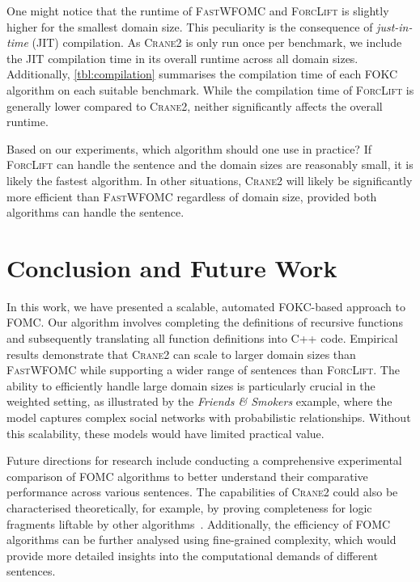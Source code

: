 \documentclass[a4paper,UKenglish,cleveref,autoref]{lipics-v2021}
\newcommand{\Cranetwo}{\textsc{Crane2}}
\newcommand{\friends}{\emph{Friends \& Smokers}}
\begin{document}
One might notice that the runtime of \textsc{FastWFOMC} and \textsc{ForcLift} is
slightly higher for the smallest domain size. This peculiarity is the
consequence of \emph{just-in-time} (JIT) compilation. As \Cranetwo{} is only run
once per benchmark, we include the JIT compilation time in its overall runtime
across all domain sizes. Additionally, \cref{tbl:compilation} summarises the
compilation time of each FOKC algorithm on each suitable benchmark. While the
compilation time of \textsc{ForcLift} is generally lower compared to
\Cranetwo{}, neither significantly affects the overall runtime.

Based on our experiments, which algorithm should one use in practice? If
\textsc{ForcLift} can handle the sentence and the domain sizes are reasonably
small, it is likely the fastest algorithm. In other situations, \Cranetwo{} will
likely be significantly more efficient than \textsc{FastWFOMC} regardless of
domain size, provided both algorithms can handle the sentence.

\section{Conclusion and Future Work}\label{sec:conclusion}

In this work, we have presented a scalable, automated FOKC-based approach to
FOMC\@. Our algorithm involves completing the definitions of recursive functions
and subsequently translating all function definitions into C++ code. Empirical
results demonstrate that \Cranetwo{} can scale to larger domain sizes than
\textsc{FastWFOMC} while supporting a wider range of sentences than
\textsc{ForcLift}. The ability to efficiently handle large domain sizes is
particularly crucial in the weighted setting, as illustrated by the \friends{}
example, where the model captures complex social networks with probabilistic
relationships. Without this scalability, these models would have limited
practical value.

Future directions for research include conducting a comprehensive experimental
comparison of FOMC algorithms to better understand their comparative performance
across various sentences. The capabilities of \Cranetwo{} could also be
characterised theoretically, for example, by proving completeness for logic
fragments liftable by other
algorithms~\cite{DBLP:journals/jair/Kuzelka21,DBLP:conf/aaai/TothK23,DBLP:journals/ai/BremenK23}.
Additionally, the efficiency of FOMC algorithms can be further analysed using
fine-grained complexity, which would provide more detailed insights into the
computational demands of different sentences.


\end{document}
